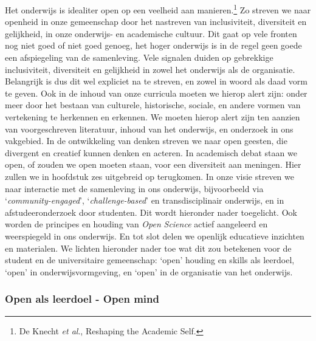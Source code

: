 \documentclass[smallauthor, chapterhaspagenum, nochapterinheader, pagenuminheader,  bigchapnum,medium2, tocpages,  garamond, titleinheader]{jote-book}
\begin{document}
	Het onderwijs is idealiter open op een veelheid aan manieren.\footnote{De Knecht \emph{et al}., Reshaping the Academic Self.} Zo streven we naar openheid in onze gemeenschap door het nastreven van inclusiviteit, diversiteit en gelijkheid, in onze onderwijs- en academische cultuur. Dit gaat op vele fronten nog niet goed of niet goed genoeg, het hoger onderwijs is in de regel geen goede een afspiegeling van de samenleving. Vele signalen duiden op gebrekkige inclusiviteit, diversiteit en gelijkheid in zowel het onderwijs als de organisatie. Belangrijk is dus dit wel expliciet na te streven, en zowel in woord als daad vorm te geven. Ook in de inhoud van onze curricula moeten we hierop alert zijn: onder meer door het bestaan van culturele, historische, sociale, en andere vormen van vertekening te herkennen en erkennen. We moeten hierop alert zijn ten aanzien van voorgeschreven literatuur, inhoud van het onderwijs, en onderzoek in ons vakgebied. In de ontwikkeling van denken streven we naar open geesten, die divergent en creatief kunnen denken en acteren. In academisch debat staan we open, of zouden we open moeten staan, voor een diversiteit aan meningen. Hier zullen we in hoofdstuk zes uitgebreid op terugkomen. In onze visie streven we naar interactie met de samenleving in ons onderwijs, bijvoorbeeld via ‘\emph{community-}\emph{engaged}', ‘\emph{challenge-based}' en transdisciplinair onderwijs, en in afstudeeronderzoek door studenten. Dit wordt hieronder nader toegelicht. Ook worden de principes en houding van \emph{Open }\emph{Science} actief aangeleerd en weerspiegeld in ons onderwijs. En tot slot delen we openlijk educatieve inzichten en materialen. We lichten hieronder nader toe wat dit zou betekenen voor de student en de universitaire gemeenschap: ‘open' houding en skills als leerdoel, ‘open' in onderwijsvormgeving, en ‘open' in de organisatie van het onderwijs.



	\subsubsection{Open als leerdoel - Open mind}
\end{document}
